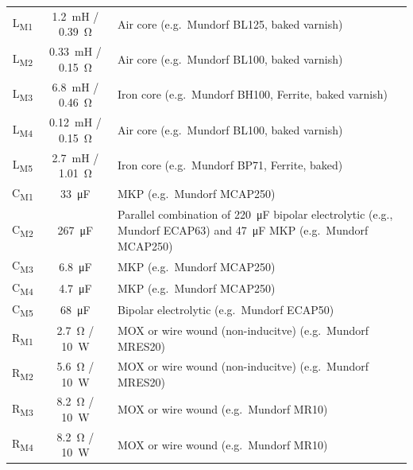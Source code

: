 \documentclass[12pt,a4paper]{article}
\providecommand{\inductor}[1]{L\textsubscript{#1}}
\providecommand{\capacitor}[1]{C\textsubscript{#1}}
\providecommand{\resistor}[1]{R\textsubscript{#1}}
\begin{document}
\begin{table}[p]
\begin{tabular}{ccp{}}
\inductor{M1}	& \SI{1.2}{mH} / \SI{0.39}{\ohm}	& Air core (e.g.~Mundorf BL125, baked varnish)\\
\inductor{M2}	& \SI{0.33}{mH} / \SI{0.15}{\ohm}	& Air core (e.g.~Mundorf BL100, baked varnish)\\
\inductor{M3}	& \SI{6.8}{mH} / \SI{0.46}{\ohm}	& Iron core (e.g.~Mundorf BH100, Ferrite, baked varnish)\\
\inductor{M4}	& \SI{0.12}{mH} / \SI{0.15}{\ohm}	& Air core (e.g.~Mundorf BL100, baked varnish)\\
\inductor{M5}	& \SI{2.7}{mH} / \SI{1.01}{\ohm}	& Iron core (e.g.~Mundorf BP71, Ferrite, baked)\\
\capacitor{M1}	& \SI{33}{\micro F}			& MKP (e.g.~Mundorf MCAP250)\\
\capacitor{M2}	& \SI{267}{\micro F}			& Parallel combination of \SI{220}{\micro F} bipolar electrolytic (e.g., Mundorf ECAP63) and \SI{47}{\micro F} MKP (e.g.~Mundorf MCAP250)\\
\capacitor{M3}	& \SI{6.8}{\micro F}			& MKP (e.g.~Mundorf MCAP250)\\
\capacitor{M4}	& \SI{4.7}{\micro F}			& MKP (e.g.~Mundorf MCAP250)\\
\capacitor{M5}	& \SI{68}{\micro F}			& Bipolar electrolytic (e.g.~Mundorf ECAP50)\\
\resistor{M1}	& \SI{2.7}{\ohm} / \SI{10}{W}		& MOX or wire wound (non-inducitve) (e.g.~Mundorf MRES20)\\
\resistor{M2}	& \SI{5.6}{\ohm} / \SI{10}{W}		& MOX or wire wound (non-inducitve) (e.g.~Mundorf MRES20)\\
\resistor{M3}	& \SI{8.2}{\ohm} / \SI{10}{W}		& MOX or wire wound (e.g.~Mundorf MR10)\\
\resistor{M4}	& \SI{8.2}{\ohm} / \SI{10}{W}		& MOX or wire wound (e.g.~Mundorf MR10)\\

\midrule


\end{tabular}
\end{table}
\end{document}

